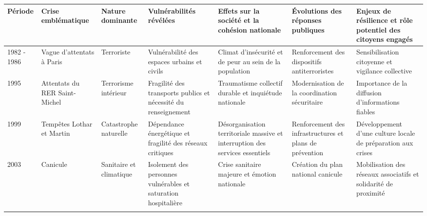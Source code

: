 \begin{table}[H]
\centering
\StyledTableSetup
\scriptsize

\xdef\noteCrisesAvantDeuxMilleTerrorisme{\number\value{footnote}}
\xdef\noteCrisesAvantDeuxMilleTempetes{\number\value{footnote}}
\xdef\noteCrisesAvantDeuxMilleCanicule{\number\value{footnote}}
\xdef\noteCrisesAvantDeuxMilleBanlieues{\number\value{footnote}}

\begin{tabularx}{\linewidth}{@{}
p{1.2cm}
p{2.2cm}
p{2.1cm}
Y
Y
Y
Y
@{}}

\toprule
\textbf{Période} &
\textbf{Crise emblématique} &
\textbf{Nature dominante} &
\textbf{Vulnérabilités révélées} &
\textbf{Effets sur la société et la cohésion nationale} &
\textbf{Évolutions des réponses publiques} &
\textbf{Enjeux de résilience et rôle potentiel des citoyens engagés} \\
\midrule

1982 - 1986 &
Vague d'attentats à Paris &
Terroriste &
Vulnérabilité des espaces urbains et civils &
Climat d'insécurité et de peur au sein de la population &
Renforcement des dispositifs antiterroristes\footnotemark[\noteCrisesAvantDeuxMilleTerrorisme] &
Sensibilisation citoyenne et vigilance collective \\
\addlinespace

1995 &
Attentats du RER Saint-Michel &
Terrorisme intérieur &
Fragilité des transports publics et nécessité du renseignement &
Traumatisme collectif durable et inquiétude nationale &
Modernisation de la coordination sécuritaire\footnotemark[\noteCrisesAvantDeuxMilleTerrorisme] &
Importance de la diffusion d'informations fiables \\
\addlinespace

1999 &
Tempêtes Lothar et Martin &
Catastrophe naturelle &
Dépendance énergétique et fragilité des réseaux critiques &
Désorganisation territoriale massive et interruption des services essentiels &
Renforcement des infrastructures et plans de prévention\footnotemark[\noteCrisesAvantDeuxMilleTempetes] &
Développement d'une culture locale de préparation aux crises \\
\addlinespace

2003 &
Canicule &
Sanitaire et climatique &
Isolement des personnes vulnérables et saturation hospitalière &
Crise sanitaire majeure et émotion nationale &
Création du plan national canicule\footnotemark[\noteCrisesAvantDeuxMilleCanicule] &
Mobilisation des réseaux associatifs et solidarité de proximité \\
\addlinespace


\end{tabularx}
\end{table}
